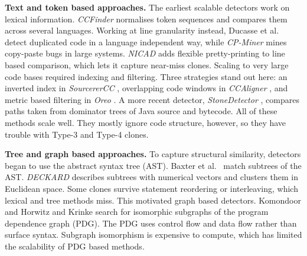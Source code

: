 \documentclass[final,5p,times,twocolumn]{elsarticle}
\theoremstyle{plain}
\begin{document}
\textbf{Text and token based approaches.} The earliest scalable detectors
work on lexical information. \emph{CCFinder} \cite{kamiya2002ccfinder}
normalises token sequences and compares them across several languages.
Working at line granularity instead, Ducasse et al.\
\cite{ducasse1999language} detect duplicated code in a language independent
way, while \emph{CP-Miner} \cite{li2006cpminer} mines copy-paste bugs in
large systems. \emph{NICAD} \cite{roy2008nicad} adds flexible
pretty-printing to line based comparison, which lets it capture near-miss
clones. Scaling to very large code bases required indexing and filtering.
Three strategies stand out here: an inverted index in \emph{SourcererCC}
\cite{sajnani2016sourcerercc}, overlapping code windows in
\emph{CCAligner} \cite{wang2018ccaligner}, and metric based filtering in
\emph{Oreo} \cite{saini2018oreo}. A more recent detector,
\emph{StoneDetector} \cite{heinze2025stonedetector}, compares paths taken
from dominator trees of Java source and bytecode. All of these methods
scale well. They mostly ignore code structure, however, so they have
trouble with Type-3 and Type-4 clones.

\textbf{Tree and graph based approaches.} To capture structural
similarity, detectors began to use the abstract syntax tree (AST).
Baxter et al.\ \cite{baxter1998clone} match subtrees of the AST.
\emph{DECKARD} \cite{jiang2007deckard} describes subtrees with numerical
vectors and clusters them in Euclidean space. Some clones survive
statement reordering or interleaving, which lexical and tree methods miss.
This motivated graph based detectors. Komondoor and Horwitz
\cite{komondoor2001slicing} and Krinke \cite{krinke2001identifying} search
for isomorphic subgraphs of the program dependence graph (PDG). The PDG
uses control flow and data flow rather than surface syntax. Subgraph
isomorphism is expensive to compute, which has limited the scalability of
PDG based methods.
\end{document}
